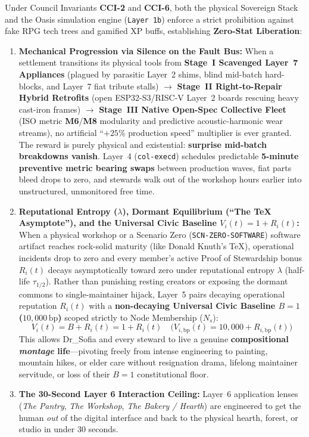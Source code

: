 Under Council Invariants \textbf{CCI-2} and \textbf{CCI-6}, both the physical Sovereign Stack and the Oasis simulation engine (\texttt{Layer 1b}) enforce a strict prohibition against fake RPG tech trees and gamified XP buffs, establishing \textbf{Zero-Stat Liberation}:
\begin{enumerate}
    \item \textbf{Mechanical Progression via Silence on the Fault Bus:} When a settlement transitions its physical tools from \textbf{Stage~I Scavenged Layer~7 Appliances} (plagued by parasitic Layer~2 shims, blind mid-batch hard-blocks, and Layer~7 fiat tribute stalls) $\to$ \textbf{Stage~II Right-to-Repair Hybrid Retrofits} (open ESP32-S3/RISC-V Layer~2 boards rescuing heavy cast-iron frames) $\to$ \textbf{Stage~III Native Open-Spec Collective Fleet} (ISO metric \textbf{M6}/\textbf{M8} modularity and predictive acoustic-harmonic wear streams), no artificial ``$+25\%$ production speed'' multiplier is ever granted. The reward is purely physical and existential: \textbf{surprise mid-batch breakdowns vanish}. Layer~4 (\texttt{col-execd}) schedules predictable \textbf{5-minute preventive metric bearing swaps} between production waves, fiat parts bleed drops to zero, and stewards walk out of the workshop hours earlier into unstructured, unmonitored free time.
    \item \textbf{Reputational Entropy ($\lambda$), Dormant Equilibrium (``The TeX Asymptote''), and the Universal Civic Baseline $V_i(t) = 1 + R_i(t)$:} When a physical workshop or a Scenario Zero (\texttt{SCN-ZERO-SOFTWARE}) software artifact reaches rock-solid maturity (like Donald Knuth's \TeX{}), operational incidents drop to zero and every member's active Proof of Stewardship bonus $R_i(t)$ decays asymptotically toward zero under reputational entropy $\lambda$ (half-life $\tau_{1/2}$). Rather than punishing resting creators or exposing the dormant commons to single-maintainer hijack, Layer~5 pairs decaying operational reputation $R_i(t)$ with a \textbf{non-decaying Universal Civic Baseline $B = 1$ ($10{,}000\,\mathrm{bp}$)} scoped strictly to Node Membership ($N_s$):
    \begin{equation}
    V_i(t) = B + R_i(t) = 1 + R_i(t) \quad \bigl(V_{i,\mathrm{bp}}(t) = 10{,}000 + R_{i,\mathrm{bp}}(t)\bigr)
    \label{eq:psych_universal_civic_baseline}
    \end{equation}
    This allows Dr\_Sofia and every steward to live a genuine \textbf{compositional \textit{montage} life}---pivoting freely from intense engineering to painting, mountain hikes, or elder care without resignation drama, lifelong maintainer servitude, or loss of their $B = 1$ constitutional floor.
    \item \textbf{The 30-Second Layer 6 Interaction Ceiling:} Layer~6 application lenses (\textit{The Pantry}, \textit{The Workshop}, \textit{The Bakery / Hearth}) are engineered to get the human \textit{out} of the digital interface and back to the physical hearth, forest, or studio in under 30 seconds.
\end{enumerate}

